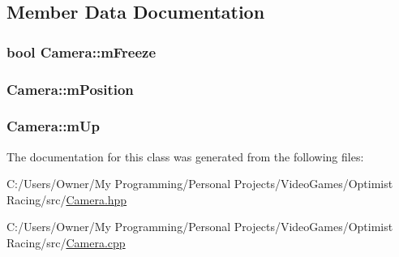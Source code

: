 \subsection{Member Data Documentation}
\hypertarget{class_camera_ae2a9a29d6dfb6626c08ecf9b5ed444da}{
\subsubsection[{m\-Freeze}]{\setlength{\rightskip}{0pt plus 5cm}bool Camera\-::m\-Freeze\hspace{0.3cm}{\ttfamily [protected]}}}\label{class_camera_ae2a9a29d6dfb6626c08ecf9b5ed444da}
\hypertarget{class_camera_a893ec886bbdbc025e54a492b54c585ca}{
\subsubsection[{m\-Position}]{ Camera\-::m\-Position\hspace{0.3cm}{\ttfamily [protected]}}}\label{class_camera_a893ec886bbdbc025e54a492b54c585ca}
\hypertarget{class_camera_a5569a68f84f82a1fcf128baac654562a}{
\subsubsection[{m\-Up}]{ Camera\-::m\-Up\hspace{0.3cm}{\ttfamily [protected]}}}\label{class_camera_a5569a68f84f82a1fcf128baac654562a}


The documentation for this class was generated from the following files\-:\begin{DoxyCompactItemize}
\item 
C\-:/\-Users/\-Owner/\-My Programming/\-Personal Projects/\-Video\-Games/\-Optimist Racing/src/\hyperlink{_camera_8hpp}{Camera.\-hpp}\item 
C\-:/\-Users/\-Owner/\-My Programming/\-Personal Projects/\-Video\-Games/\-Optimist Racing/src/\hyperlink{_camera_8cpp}{Camera.\-cpp}\end{DoxyCompactItemize}
